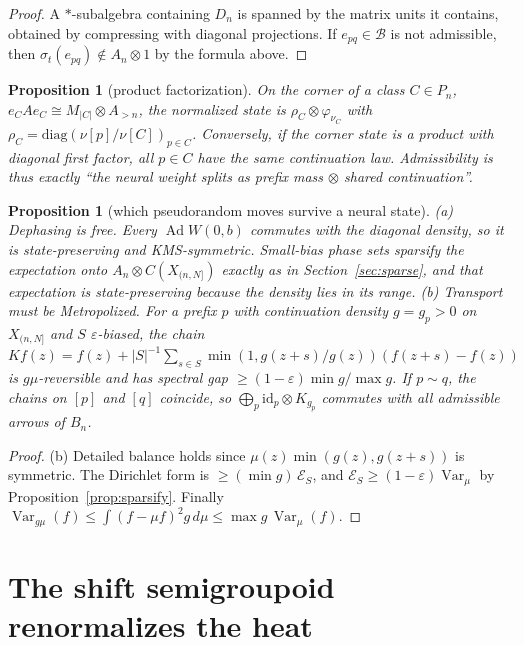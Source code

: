 \documentclass[11pt]{article}
\newtheorem{proposition}[theorem]{Proposition}
\theoremstyle{definition}
\theoremstyle{remark}
\newcommand{\Ad}{\operatorname{Ad}}
\newcommand{\id}{\mathrm{id}}
\newcommand{\Var}{\operatorname{Var}}
\begin{document}
\begin{proof}
A $*$-subalgebra containing $D_n$ is spanned by the matrix units it contains, obtained by compressing with diagonal projections. If $e_{pq}\in\mathcal B$ is not admissible, then $\sigma_t(e_{pq})\notin A_n\otimes1$ by the formula above.
\end{proof}

\begin{proposition}[product factorization]\label{prop:product}
On the corner of a class $C\in P_n$, $e_CAe_C\cong M_{|C|}\otimes A_{>n}$, the normalized state is $\rho_C\otimes\varphi_{\nu_C}$ with $\rho_C=\mathrm{diag}(\nu[p]/\nu[C])_{p\in C}$. Conversely, if the corner state is a product with diagonal first factor, all $p\in C$ have the same continuation law. Admissibility is thus exactly ``the neural weight splits as prefix mass $\otimes$ shared continuation''.
\end{proposition}

\begin{proposition}[which pseudorandom moves survive a neural state]\label{prop:moves}
(a) \emph{Dephasing is free.} Every $\Ad W(0,b)$ commutes with the diagonal density, so it is state-preserving and KMS-symmetric. Small-bias phase sets sparsify the expectation onto $A_n\otimes C(X_{(n,N]})$ exactly as in Section~\ref{sec:sparse}, and that expectation is state-preserving because the density lies in its range.
(b) \emph{Transport must be Metropolized.} For a prefix $p$ with continuation density $g=g_p>0$ on $X_{(n,N]}$ and $S$ $\varepsilon$-biased, the chain $Kf(z)=f(z)+|S|^{-1}\sum_{s\in S}\min(1,g(z+s)/g(z))(f(z+s)-f(z))$ is $g\mu$-reversible and has spectral gap $\ge(1-\varepsilon)\min g/\max g$. If $p\sim q$, the chains on $[p]$ and $[q]$ coincide, so $\bigoplus_p\id_p\otimes K_{g_p}$ commutes with all admissible arrows of $B_n$.
\end{proposition}

\begin{proof}
(b) Detailed balance holds since $\mu(z)\min(g(z),g(z+s))$ is symmetric. The Dirichlet form is $\ge(\min g)\,\mathcal E_S$, and $\mathcal E_S\ge(1-\varepsilon)\Var_\mu$ by Proposition~\ref{prop:sparsify}. Finally $\Var_{g\mu}(f)\le\int(f-\mu f)^2g\,d\mu\le\max g\,\Var_\mu(f)$.
\end{proof}

\section{The shift semigroupoid renormalizes the heat}\label{sec:shift}
\end{document}
